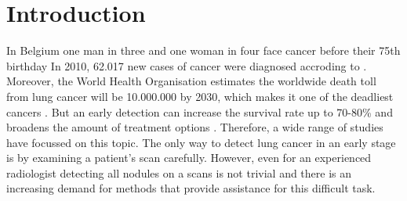 \section{Introduction}
In Belgium one man in three and one woman in four face cancer before their 75th
birthday \cite{kanker} In 2010, 62.017 new cases of cancer were diagnosed
accroding to \cite{kankerliga}. Moreover, the World Health Organisation
estimates the worldwide death toll from lung cancer will be 10.000.000 by 2030,
which makes it one of the deadliest cancers \cite{gu, zheng}. But an early
detection can increase the survival rate up to 70-80\% \cite{swensen} and
broadens the amount of treatment options \cite{greenlee}. Therefore, a wide
range of studies have focussed on this topic. The only way to detect lung cancer
in an early stage is by examining a patient's scan carefully. However, even for
an experienced radiologist detecting all nodules on a scans is not trivial and
there is an increasing demand for methods that provide assistance for this
difficult task.

